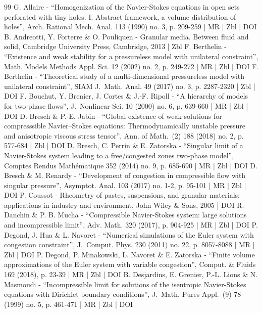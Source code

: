 \documentclass[10pt]{amsart}
\newcommand{\<}{\bigl\langle}
\renewcommand{\>}{\bigr\rangle}
\theoremstyle{definition}
\theoremstyle{remark}
\begin{document}
\begin{thebibliography}{99}
G. Allaire - “Homogenization of the Navier-Stokes equations in open sets perforated with tiny holes. I. Abstract framework, a volume distribution of holes”, Arch. Rational Mech. Anal. 113 (1990) no. 3, p. 209-259 | MR | Zbl | DOI
B. Andreotti, Y. Forterre \& O. Pouliquen - Granular media. Between fluid and solid, Cambridge University Press, Cambridge, 2013 | Zbl
F. Berthelin - “Existence and weak stability for a pressureless model with unilateral constraint”, Math. Models Methods Appl. Sci. 12 (2002) no. 2, p. 249-272 | MR | Zbl | DOI
F. Berthelin - “Theoretical study of a multi-dimensional pressureless model with unilateral constraint”, SIAM J. Math. Anal. 49 (2017) no. 3, p. 2287-2320 | Zbl | DOI
F. Bouchut, Y. Brenier, J. Cortes \& J.-F. Ripoll - “A hierarchy of models for two-phase flows”, J. Nonlinear Sci. 10 (2000) no. 6, p. 639-660 | MR | Zbl | DOI
D. Bresch \& P.-E. Jabin - “Global existence of weak solutions for compresssible Navier–Stokes equations: Thermodynamically unstable pressure and anisotropic viscous stress tensor”, Ann. of Math. (2) 188 (2018) no. 2, p. 577-684 | Zbl | DOI
D. Bresch, C. Perrin \& E. Zatorska - “Singular limit of a Navier-Stokes system leading to a free/congested zones two-phase model”, Comptes Rendus Mathématique 352 (2014) no. 9, p. 685-690 | MR | Zbl | DOI
D. Bresch \& M. Renardy - “Development of congestion in compressible flow with singular pressure”, Asymptot. Anal. 103 (2017) no. 1-2, p. 95-101 | MR | Zbl | DOI
P. Coussot - Rheometry of pastes, suspensions, and granular materials: applications in industry and environment, John Wiley \& Sons, 2005 | DOI
R. Danchin \& P. B. Mucha - “Compressible Navier-Stokes system: large solutions and incompressible limit”, Adv. Math. 320 (2017), p. 904-925 | MR | Zbl | DOI
P. Degond, J. Hua \& L. Navoret - “Numerical simulations of the Euler system with congestion constraint”, J. Comput. Phys. 230 (2011) no. 22, p. 8057-8088 | MR | Zbl | DOI
P. Degond, P. Minakowski, L. Navoret \& E. Zatorska - “Finite volume approximations of the Euler system with variable congestion”, Comput. \& Fluids 169 (2018), p. 23-39 | MR | Zbl | DOI
B. Desjardins, E. Grenier, P.-L. Lions \& N. Masmoudi - “Incompressible limit for solutions of the isentropic Navier-Stokes equations with Dirichlet boundary conditions”, J. Math. Pures Appl. (9) 78 (1999) no. 5, p. 461-471 | MR | Zbl | DOI

\end{thebibliography}
\end{document}
